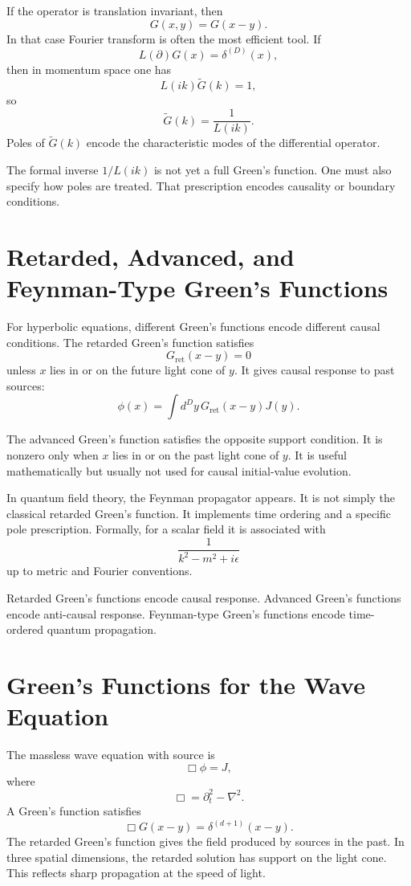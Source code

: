 If the operator is translation invariant, then
\[
    G(x,y)=G(x-y).
\]
In that case Fourier transform is often the most efficient tool. If
\[
    L(\partial)G(x)=\delta^{(D)}(x),
\]
then in momentum space one has
\[
    L(ik)\widetilde{G}(k)=1,
\]
so
\[
    \widetilde{G}(k)=\frac{1}{L(ik)}.
\]
Poles of \(\widetilde{G}(k)\) encode the characteristic modes of the differential
operator.

\begin{remarkbox}
The formal inverse \(1/L(ik)\) is not yet a full Green's function. One must also
specify how poles are treated. That prescription encodes causality or boundary
conditions.
\end{remarkbox}

\section{Retarded, Advanced, and Feynman-Type Green's Functions}

For hyperbolic equations, different Green's functions encode different causal
conditions. The retarded Green's function satisfies
\[
    G_{\mathrm{ret}}(x-y)=0
\]
unless \(x\) lies in or on the future light cone of \(y\). It gives causal
response to past sources:
\[
    \phi(x)=\int d^D y\,G_{\mathrm{ret}}(x-y)J(y).
\]

The advanced Green's function satisfies the opposite support condition. It is
nonzero only when \(x\) lies in or on the past light cone of \(y\). It is useful
mathematically but usually not used for causal initial-value evolution.

In quantum field theory, the Feynman propagator appears. It is not simply the
classical retarded Green's function. It implements time ordering and a specific
pole prescription. Formally, for a scalar field it is associated with
\[
    \frac{1}{k^2-m^2+i\epsilon}
\]
up to metric and Fourier conventions.

\begin{definitionbox}
Retarded Green's functions encode causal response. Advanced Green's functions
encode anti-causal response. Feynman-type Green's functions encode time-ordered
quantum propagation.
\end{definitionbox}

\section{Green's Functions for the Wave Equation}

The massless wave equation with source is
\[
    \Box\phi=J,
\]
where
\[
    \Box=\partial_t^2-\nabla^2.
\]
A Green's function satisfies
\[
    \Box G(x-y)=\delta^{(d+1)}(x-y).
\]
The retarded Green's function gives the field produced by sources in the past.
In three spatial dimensions, the retarded solution has support on the light cone.
This reflects sharp propagation at the speed of light.

